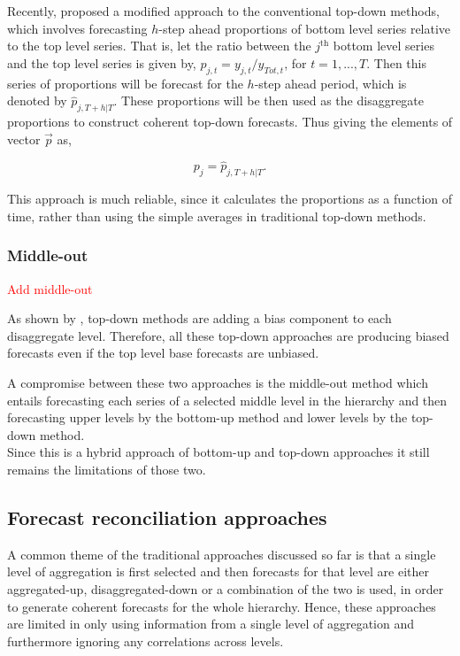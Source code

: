 \documentclass[graybox]{svmult}
\begin{document}
Recently, \cite{Mircetic2017} proposed a modified approach to the conventional top-down methods, which involves forecasting $h$-step ahead proportions of bottom level series relative to the top level series. That is, let the ratio between the $j^\text{th}$ bottom level series and the top level series is given by, $p_{j,t}=y_{j,t}/y_{Tot,t}$, for $t=1,...,T$. Then this series of proportions will be forecast for the $h$-step ahead period, which is denoted by $\hat{p}_{j,T+h|T}$. These proportions will be then used as the disaggregate proportions to construct coherent top-down forecasts. Thus giving the elements of vector $\vec{p}$ as,

\begin{equation}
p_j = \hat{p}_{j,T+h|T}.
\end{equation}

This approach is much reliable, since it calculates the proportions as a function of time, rather than using the simple averages in traditional top-down methods.

\subsubsection{Middle-out}
\textcolor{red}{Add middle-out}

As shown by \cite{HynEtAl2011}, top-down methods are adding a bias component to each disaggregate level. Therefore, all these top-down approaches are producing biased forecasts even if the top level base forecasts are unbiased.

A compromise between these two approaches is the middle-out method which entails forecasting each series of a selected middle level in the hierarchy and then forecasting upper levels by the bottom-up method and lower levels by the top-down method.\\
Since this is a hybrid approach of bottom-up and top-down approaches it still remains the limitations of those two.

\subsection{Forecast reconciliation approaches}

A common theme of the traditional approaches discussed so far is that a single level of aggregation is first selected and then forecasts for that level are either aggregated-up, disaggregated-down or a combination of the two is used, in order to generate coherent forecasts for the whole hierarchy. Hence, these approaches are limited in only using information from a single level of aggregation and furthermore ignoring any correlations across levels.
\end{document}
